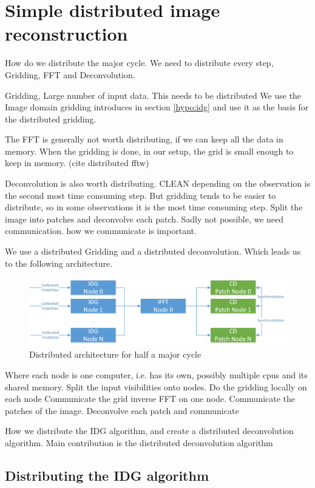 \section{Simple distributed image reconstruction}\label{dist}
How do we distribute the major cycle. We need to distribute every step, Gridding, FFT and Deconvolution.

Gridding, Large number of input data. This needs to be distributed
We use the Image domain gridding introduces in section \ref{hypo:idg} and use it as the basis for the distributed gridding.

The FFT is generally not worth distributing, if we can keep all the data in memory. When the gridding is done, in our setup, the grid is small enough to keep in memory. (cite distributed fftw)

Deconvolution is also worth distributing. CLEAN depending on the observation is the second most time consuming step. But gridding tends to be easier to distribute, so in some observations it is the most time consuming step.
Split the image into patches and deconvolve each patch.
Sadly not possible, we need communication. how we communicate is important.

We use a distributed Gridding and a distributed deconvolution. Which leads us to the following architecture.

\begin{figure}[h]
	\centering
	\includegraphics[width=0.80\linewidth]{./chapters/03.distribution/distributed_architecture.png}
	\caption{Distributed architecture for half a major cycle}
	\label{dist:architecture:fig}
\end{figure}

Where each node is one computer, i.e. has its own, possibly multiple cpus and its shared memory.
Split the input visibilities onto nodes. 
Do the gridding locally on each node
Communicate the grid
inverse FFT on one node.
Communicate the patches of the image.
Deconvolve each patch and communicate

How we distribute the IDG algorithm, and create a distributed deconvolution algorithm. Main contribution is the distributed deconvolution algorithm


\subsection{Distributing the IDG algorithm}\label{distribution:idg}





